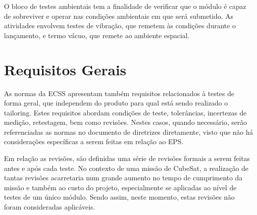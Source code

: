 O bloco de testes ambientais tem a finalidade de verificar que o módulo é capaz de sobreviver e operar nas condições ambientais em que será submetido.
As atividades envolvem testes de vibração, que remetem às condições durante o lançamento, e termo vácuo, que remete ao ambiente espacial.


\section{Requisitos Gerais}


As normas da \gls{ECSS} apresentam também requisitos relacionados à testes de forma geral, que independem do produto para qual está sendo realizado o tailoring.
Estes requisitos abordam condições de teste, tolerâncias, incertezas de medição, retestagem, bem como revisões.
Nestes casos, quando necessário, serão referenciadas as normas no documento de diretrizes diretamente, visto que não há considerações específicas a serem feitas em relação ao \gls{EPS}.

Em relação as revisões, são definidas uma série de revisões formais a serem feitas antes e após cada teste.
No contexto de uma missão de CubeSat, a realização de tantas revisões acarretaria num grande aumento no tempo de cumprimento da missão e também ao custo do projeto, especialmente  se aplicadas ao nível de testes de um único módulo.
Sendo assim, neste momento, estas revisões não foram consideradas aplicáveis.
